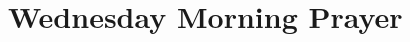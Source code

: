 \documentclass[12pt,twocolumn]{book}
\begin{document}





\section{Wednesday Morning Prayer}






\end{document}
